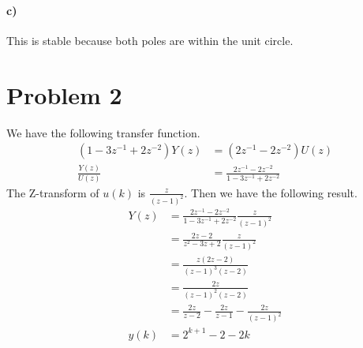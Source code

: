 \documentclass[12pt]{article}
\begin{document}
\paragraph{c)}

This is stable because both poles are within the unit circle.

\section*{Problem 2}

We have the following transfer function.
\begin{align*}
    (1-3z^{-1}+2z^{-2})Y(z)&=(2z^{-1}-2z^{-2})U(z)\\
    \frac{Y(z)}{U(z)}&=\frac{2z^{-1}-2z^{-2}}{1-3z^{-1}+2z^{-2}}
\end{align*}
The Z-transform of \(u(k)\) is \(\frac{z}{(z-1)^2}\). Then we have the following result.
\begin{align*}
    Y(z)&=\frac{2z^{-1}-2z^{-2}}{1-3z^{-1}+2z^{-2}}\frac{z}{(z-1)^2}\\
    &=\frac{2z-2}{z^2-3z+2}\frac{z}{(z-1)^2}\\
    &=\frac{z(2z-2)}{(z-1)^3(z-2)}\\
    &=\frac{2z}{(z-1)^2(z-2)}\\
    &=\frac{2z}{z-2} - \frac{2z}{z-1} - \frac{2z}{(z-1)^2}\\
    y(k)&=2^{k+1} - 2 - 2k
\end{align*}
\end{document}

